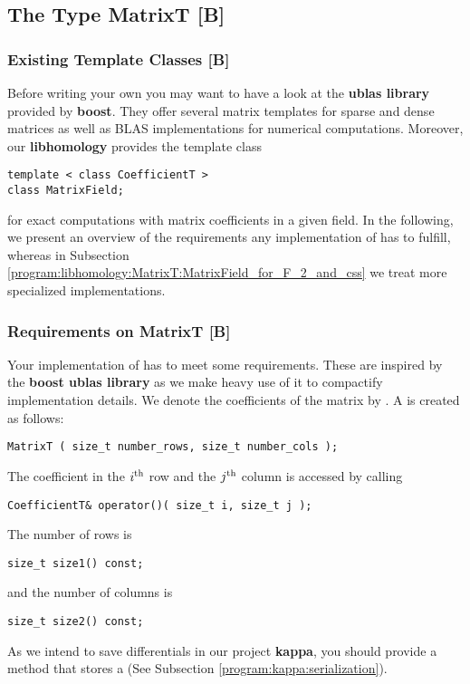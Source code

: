 \subsection{The Type MatrixT [B]}
\label{program:libhomology:MatrixT}
\subsubsection{Existing Template Classes [B]}
Before writing your own  you may want to have a look at the {\bf ublas library} provided by {\bf boost}.
They offer several matrix templates for sparse and dense matrices 
as well as BLAS implementations for numerical computations.
Moreover, our {\bf libhomology} provides the template class
\begin{lstlisting}
template < class CoefficientT >
class MatrixField;
\end{lstlisting}
for exact computations with matrix coefficients in a given field.
In the following, we present an overview of the requirements any implementation of  has to fulfill, whereas
in Subsection \ref{program:libhomology:MatrixT:MatrixField_for_F_2_and_css} we treat more specialized implementations.

\subsubsection{Requirements on MatrixT [B]}
Your implementation of  has to meet some requirements.
These are inspired by the {\bf boost ublas library} as we make heavy use of it to compactify implementation details.
We denote the coefficients of the matrix by .
A  is created as follows:
\begin{lstlisting}
MatrixT ( size_t number_rows, size_t number_cols );
\end{lstlisting}
The coefficient in the $i^{\text{th}}$ row and the $j^{\text{th}}$ column is accessed by calling
\begin{lstlisting}
CoefficientT& operator()( size_t i, size_t j );
\end{lstlisting}
The number of rows is 
\begin{lstlisting}
size_t size1() const;
\end{lstlisting}
and the number of columns is
\begin{lstlisting}
size_t size2() const;
\end{lstlisting}

As we intend to save differentials in our project {\bf kappa}, you should provide a method that stores a  (See Subsection \ref{program:kappa:serialization}).

